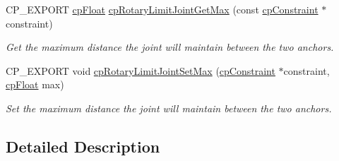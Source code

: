 \begin{DoxyCompactItemize}
\mbox{\label{group__cp_rotary_limit_joint_ga074951df3b5fd56e77b7a657c38b6ce9}} 
C\+P\+\_\+\+E\+X\+P\+O\+RT \mbox{\hyperlink{group__basic_types_gac1ed65573e035bf892505768c852d8d3}{cp\+Float}} \mbox{\hyperlink{group__cp_rotary_limit_joint_ga074951df3b5fd56e77b7a657c38b6ce9}{cp\+Rotary\+Limit\+Joint\+Get\+Max}} (const \mbox{\hyperlink{structcp_constraint}{cp\+Constraint}} $\ast$constraint)
\begin{DoxyCompactList}\small\item\em Get the maximum distance the joint will maintain between the two anchors. \end{DoxyCompactList}\item 
\mbox{\label{group__cp_rotary_limit_joint_gab4db4abac5ec4a8a66fea4382ab55381}} 
C\+P\+\_\+\+E\+X\+P\+O\+RT void \mbox{\hyperlink{group__cp_rotary_limit_joint_gab4db4abac5ec4a8a66fea4382ab55381}{cp\+Rotary\+Limit\+Joint\+Set\+Max}} (\mbox{\hyperlink{structcp_constraint}{cp\+Constraint}} $\ast$constraint, \mbox{\hyperlink{group__basic_types_gac1ed65573e035bf892505768c852d8d3}{cp\+Float}} max)
\begin{DoxyCompactList}\small\item\em Set the maximum distance the joint will maintain between the two anchors. \end{DoxyCompactList}\end{DoxyCompactItemize}


\subsection{Detailed Description}

